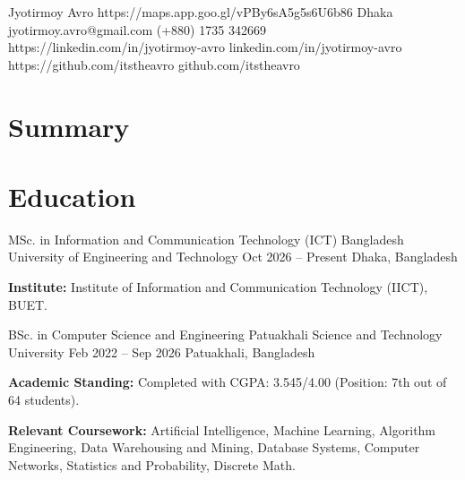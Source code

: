 \documentclass[11pt, a4paper]{article}
\begin{document}


\cvHeader
    {Jyotirmoy Avro}
    {https://maps.app.goo.gl/vPBy6sA5g5s6U6b86}
    {Dhaka}
    {jyotirmoy.avro@gmail.com}
    {(+880) 1735 342669}
    {https://linkedin.com/in/jyotirmoy-avro}
    {linkedin.com/in/jyotirmoy-avro}
    {https://github.com/itstheavro}
    {github.com/itstheavro}


\section{Summary}


\section{Education}
\cvEducation
    {MSc. in Information and Communication Technology (ICT)}
    {Bangladesh University of Engineering and Technology}
    {Oct 2026 -- Present}
    {Dhaka, Bangladesh}
    {
        \item \textbf{Institute:} Institute of Information and Communication Technology (IICT), BUET.
    }

\cvEducation
    {BSc. in Computer Science and Engineering}
    {Patuakhali Science and Technology University}
    {Feb 2022 -- Sep 2026}
    {Patuakhali, Bangladesh}
    {
        \item \textbf{Academic Standing:} Completed with CGPA: 3.545/4.00 (Position: 7th out of 64 students).
        \item \textbf{Relevant Coursework:} Artificial Intelligence, Machine Learning, Algorithm Engineering, Data Warehousing and Mining, Database Systems, Computer Networks, Statistics and Probability, Discrete Math.
    }
\end{document}
